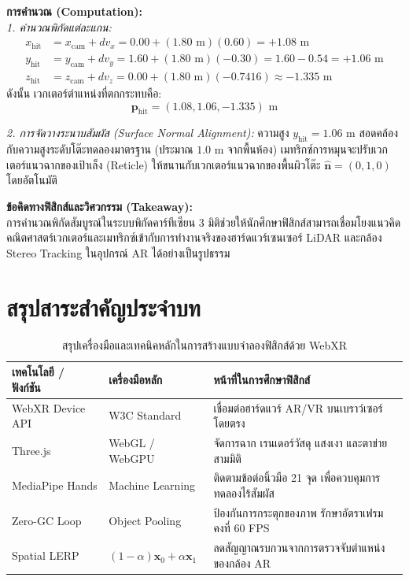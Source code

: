 \begin{psctexample}
\textbf{การคำนวณ (Computation):} \\
\textit{1. คำนวณพิกัดแต่ละแกน:}
\begin{align}
x_{\text{hit}} &= x_{\text{cam}} + d v_x = 0.00 + (1.80\text{ m}) (0.60) = +1.08\text{ m} \nonumber \\
y_{\text{hit}} &= y_{\text{cam}} + d v_y = 1.60 + (1.80\text{ m}) (-0.30) = 1.60 - 0.54 = +1.06\text{ m} \nonumber \\
z_{\text{hit}} &= z_{\text{cam}} + d v_z = 0.00 + (1.80\text{ m}) (-0.7416) \approx -1.335\text{ m}
\end{align}
ดังนั้น เวกเตอร์ตำแหน่งที่ตกกระทบคือ:
\begin{equation}
\mathbf{p}_{\text{hit}} = (1.08, 1.06, -1.335)\text{ m}
\end{equation}

\textit{2. การจัดวางระนาบสัมผัส (Surface Normal Alignment):}
ความสูง $y_{\text{hit}} = 1.06\text{ m}$ สอดคล้องกับความสูงระดับโต๊ะทดลองมาตรฐาน (ประมาณ $1.0\text{ m}$ จากพื้นห้อง) เมทริกซ์การหมุนจะปรับเวกเตอร์แนวฉากของเป้าเล็ง (Reticle) ให้ขนานกับเวกเตอร์แนวฉากของพื้นผิวโต๊ะ $\hat{\mathbf{n}} = (0, 1, 0)$ โดยอัตโนมัติ

\textbf{ข้อคิดทางฟิสิกส์และวิศวกรรม (Takeaway):} \\
การคำนวณพิกัดสัมบูรณ์ในระบบพิกัดคาร์ทีเซียน 3 มิติช่วยให้นักศึกษาฟิสิกส์สามารถเชื่อมโยงแนวคิดคณิตศาสตร์เวกเตอร์และเมทริกซ์เข้ากับการทำงานจริงของฮาร์ดแวร์เซนเซอร์ LiDAR และกล้อง Stereo Tracking ในอุปกรณ์ AR ได้อย่างเป็นรูปธรรม
\qedexam
\end{psctexample}

\section{สรุปสาระสำคัญประจำบท}

\begin{table}[H]
\centering
\small
\begin{tabularx}{\textwidth}{l >{\centering\arraybackslash}p{3.8cm} Y}
\toprule
\textbf{เทคโนโลยี / ฟังก์ชัน} & \textbf{เครื่องมือหลัก} & \textbf{หน้าที่ในการศึกษาฟิสิกส์} \\
\midrule
WebXR Device API & W3C Standard & เชื่อมต่อฮาร์ดแวร์ AR/VR บนเบราว์เซอร์โดยตรง \\
Three.js & WebGL / WebGPU & จัดการฉาก เรนเดอร์วัสดุ แสงเงา และตาข่ายสามมิติ \\
MediaPipe Hands & Machine Learning & ติดตามข้อต่อนิ้วมือ 21 จุด เพื่อควบคุมการทดลองไร้สัมผัส \\
Zero-GC Loop & Object Pooling & ป้องกันการกระตุกของภาพ รักษาอัตราเฟรมคงที่ 60 FPS \\
Spatial LERP & $(1-\alpha)\mathbf{x}_0 + \alpha\mathbf{x}_1$ & ลดสัญญาณรบกวนจากการตรวจจับตำแหน่งของกล้อง AR \\
\bottomrule
\end{tabularx}
\caption{สรุปเครื่องมือและเทคนิคหลักในการสร้างแบบจำลองฟิสิกส์ด้วย WebXR}
\label{tab:ar_xr_summary}
\end{table}


